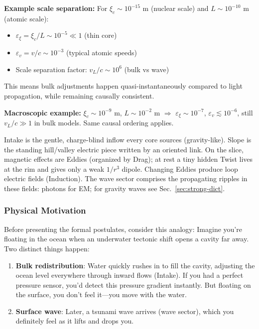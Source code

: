 \begin{tcolorbox}[title=Order-of-magnitude anchor,colback=gray!5,colframe=gray!35!black]
\textbf{Example scale separation:} For $\xi_c \sim 10^{-15}$ m (nuclear scale) and $L \sim 10^{-10}$ m (atomic scale):
\begin{itemize}
  \item $\varepsilon_\xi = \xi_c/L \sim 10^{-5} \ll 1$ (thin core)
  \item $\varepsilon_v = v/c \sim 10^{-3}$ (typical atomic speeds)
  \item Scale separation factor: $v_L/c \sim 10^{6}$ (bulk vs wave)
\end{itemize}
This means bulk adjustments happen quasi-instantaneously compared to light propagation, while remaining causally consistent.
\end{tcolorbox}

\begin{tcolorbox}[colback=gray!5,colframe=gray!35!black]
\textbf{Macroscopic example:} $\xi_c \sim 10^{-9}$ m, $L \sim 10^{-2}$ m $\Rightarrow$
$\varepsilon_\xi\sim10^{-7}$, $\varepsilon_v\lesssim10^{-6}$, still $v_L/c\gg1$ in bulk models. Same causal ordering applies.
\end{tcolorbox}

Intake is the gentle, charge-blind inflow every core sources (gravity-like). Slope is the standing hill/valley electric piece written by an oriented link. On the slice, magnetic effects are Eddies (organized by Drag); at rest a tiny hidden Twist lives at the rim and gives only a weak $1/r^3$ dipole. Changing Eddies produce loop electric fields (Induction). The wave sector comprises the propagating ripples in these fields: photons for EM; for gravity waves see Sec.~\ref{sec:strong-dict}.


\subsubsection{Physical Motivation}

Before presenting the formal postulates, consider this analogy: Imagine you're floating in the ocean when an underwater tectonic shift opens a cavity far away. Two distinct things happen:

\begin{enumerate}
\item \textbf{Bulk redistribution}: Water quickly rushes in to fill the cavity, adjusting the ocean level everywhere through inward flows (Intake). If you had a perfect pressure sensor, you'd detect this pressure gradient instantly. But floating on the surface, you don't feel it---you move with the water.
\item \textbf{Surface wave}: Later, a tsunami wave arrives (wave sector), which you definitely feel as it lifts and drops you.
\end{enumerate}

